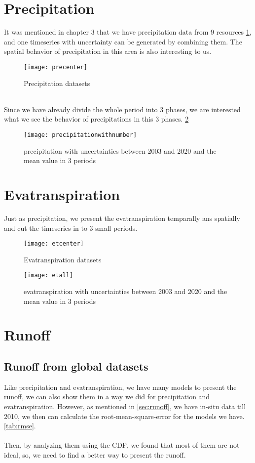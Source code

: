 \section{Precipitation}
It was mentioned in chapter 3 that we have precipitation data from 9 resources \ref{fig:precenter}, and one timeseries with uncertainty can be generated by combining them. The spatial behavior of precipitation in this area is also interesting to us. 
\begin{figure}[htbp]
	\centering
	\texttt{[image: precenter]} %
	\caption{Precipitation datasets} 
	\label{fig:precenter}
\end{figure}
\\
Since we have already divide the whole period into 3 phases, we are interested what we see the behavior of precipitations in this 3 phases. \ref{fig:allpre}
\begin{figure}[htbp]
	\centering
	\texttt{[image: precipitationwithnumber]} %
	\caption{precipitation with uncertainties between 2003 and 2020 and the mean value in 3 periods} 
	\label{fig:allpre}
\end{figure}
\clearpage
\section{Evatranspiration}
Just as precipitation, we present the evatranspiration temparally ans spatially and cut the timeseries in to 3 small periods.
\begin{figure}[htbp]
	\centering
	\texttt{[image: etcenter]} %
	\caption{Evatranspiration datasets} 
	\label{fig:etcenter}
\end{figure}
\begin{figure}[htbp]
	\centering
	\texttt{[image: etall]} %
	\caption{evatranspiration with uncertainties between 2003 and 2020 and the mean value in 3 periods} 
	\label{fig:etall}
\end{figure}

\section{Runoff}
\subsection{Runoff from global datasets}
Like precipitation and evatranspiration, we have many models to present the runoff, we can also show them in a way we did for precipitation and evatranspiration. However, as mentioned in \ref{sec:runoff}, we have in-situ data till 2010, we then can calculate the root-mean-square-error for the models we have. \ref{tab:rmse}.\\\\
Then, by analyzing them using the CDF, we found that most of them are not ideal, so, we need to find a better way to present the runoff.
